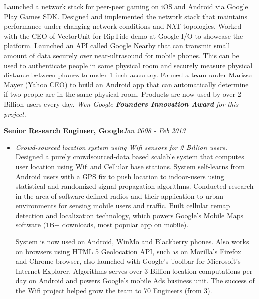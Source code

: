 \begin{resume}
\begin{itemize}
             Launched a network stack for peer-peer gaming on iOS and Android via Google Play Games SDK. Designed and
             implemented the network stack that maintains performance under changing network conditions and NAT
             topologies. Worked with the CEO of VectorUnit for RipTide demo at Google I/O to showcase the platform.
             Launched an API called Google Nearby that can transmit small amount of data securely over near-ultrasound
             for mobile phones. This can be used to authenticate people in same physical room and securely measure physical distance
             between phones to under 1 inch accuracy.
             Formed a team under Marissa Mayer (Yahoo CEO) to build an Android app that can automatically determine if two people
             are in the same physical room.
             Products are now used by over 2 Billion users every day.
             \textit{Won Google \textbf{Founders Innovation Award} for this project.}
    \end{itemize}

    {\bf Senior Research Engineer, Google}\hfill{\it Jan 2008 - Feb 2013}
    \begin{itemize}
        \item[] {\it Crowd-sourced location system using Wifi sensors for 2 Billion users.}\\

             Designed a purely crowdsourced-data based scalable system that computes user location using Wifi and Cellular base
             stations. System self-learns from Android users with a GPS fix to push location to indoor-users using
             statistical and randomized signal propagation algorithms. 
	 Conducted research in the area of software defined radios and
	 their application to urban environments for sensing mobile users and
	 traffic. Built cellular remap detection and localization technology, which
	 powers Google's Mobile Maps software (1B+ downloads, most popular
	 app on mobile).
	 
	 System is now used on Android, WinMo and Blackberry phones. Also works on browsers using HTML 5 Geolocation API, such
	 as on Mozilla's Firefox and Chrome browser, also launched with Google's Toolbar for Microsoft's Internet Explorer.
            Algorithms serves over 3 Billion location computations per day on Android and powers Google's mobile Ads
            business unit. The success of the Wifi project helped grow the team to 70 Engineers (from 3).

    \end{itemize}


\end{resume}
